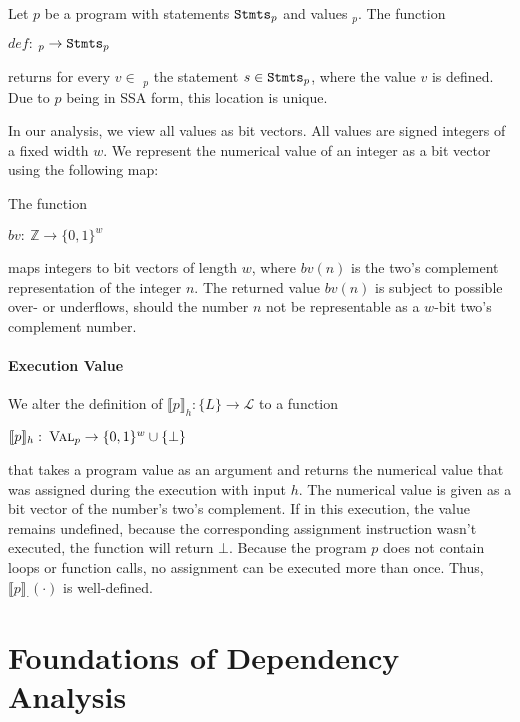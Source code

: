 \begin{definition}
    Let $p$ be a program with statements $\mathtt{Stmts}_p$ and values \val$_p$. The function
    \begin{center}
        $def: \: $\val$_p \to \mathtt{Stmts}_p$
    \end{center}
    returns for every $v \in$ \val$_p$ the statement $s \in \mathtt{Stmts}_p$, where the value $v$ is defined. Due to $p$ being in SSA form, this location is unique.
\end{definition}

In our analysis, we view all values as bit vectors. All values are signed integers of a fixed width $w$. We represent the numerical value of an integer as a bit vector using the following map:

\begin{definition}
    The function
    \begin{center}
        $bv: \:  \mathbb{Z} \to \{0, 1\}^w$
    \end{center}
    maps integers to bit vectors of length $w$, where $bv(n)$ is the two's complement representation of the integer $n$.
    The returned value $bv(n)$ is subject to possible over- or underflows, should the number $n$ not be representable as a $w$-bit two's complement number.
\end{definition}

\paragraph{Execution Value}
We alter the definition of $\llbracket p \rrbracket_h: \{L\} \to \mathcal{L}$ to a function 
\begin{center}
    $\llbracket p \rrbracket_h: \: \textsc{Val}_p \to \{0, 1\}^w \cup \{\bot\}$
\end{center} that takes a program value as an argument and returns the numerical value that was assigned during the execution with input $h$. The numerical value is given as a bit vector of the number's two's complement. If in this execution, the value remains undefined, because the corresponding assignment instruction wasn't executed, the function will return $\bot$. Because the program $p$ does not contain loops or function calls, no assignment can be executed more than once. Thus, $\llbracket p \rrbracket_\cdot(\cdot)$ is well-defined.



\section{Foundations of Dependency Analysis}\label{sec:prop}

